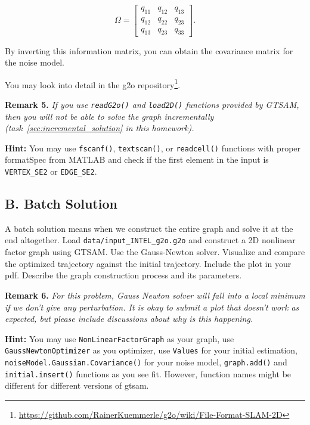 \documentclass[tp]{lcc}
\begin{document}
\begin{equation*}
    \Omega = \begin{bmatrix} q_{11} & q_{12} & q_{13} \\ q_{12} & q_{22} & q_{23} \\ q_{13} & q_{23} & q_{33} \end{bmatrix}.
\end{equation*}

By inverting this information matrix, you can obtain the covariance matrix for the noise model.

You may look into detail in the g2o repository\footnote{\url{https://github.com/RainerKuemmerle/g2o/wiki/File-Format-SLAM-2D}}.

\textbf{Remark 5.} \textit{If you use \lstinline[style=bash]{readG2o()} and \lstinline[style=bash]{load2D()} functions provided by GTSAM, then you will not be able to solve the graph incrementally (task~\ref{sec:incremental_solution} in this homework).}

\textbf{Hint:} You may use \lstinline[style=bash]{fscanf()}, \lstinline[style=bash]{textscan()}, or \lstinline[style=bash]{readcell()} functions with proper formatSpec from MATLAB and check if the first element in the input is \lstinline[style=bash]{VERTEX_SE2} or \lstinline[style=bash]{EDGE_SE2}.

\subsection{B. Batch Solution}
A batch solution means when we construct the entire graph and solve it at the end altogether. Load \lstinline[style=bash]{data/input_INTEL_g2o.g2o} and construct a 2D nonlinear factor graph using GTSAM. Use the Gauss-Newton solver. Visualize and compare the optimized trajectory against the initial trajectory. Include the plot in your pdf. Describe the graph construction process and its parameters.

\textbf{Remark 6.} \textit{For this problem, Gauss Newton solver will fall into a local minimum if we don't give any perturbation. It is okay to submit a plot that doesn't work as expected, but please include discussions about why is this happening.}

\textbf{Hint:} You may use \lstinline[style=bash]{NonLinearFactorGraph} as your graph, use \lstinline[style=bash]{GaussNewtonOptimizer} as you optimizer, use \lstinline[style=bash]{Values} for your initial estimation, \lstinline[style=bash]{noiseModel.Gaussian.Covariance()} for your noise model, \lstinline[style=bash]{graph.add()} and \lstinline[style=bash]{initial.insert()} functions as you see fit. However, function names might be different for different versions of gtsam.
\end{document}
